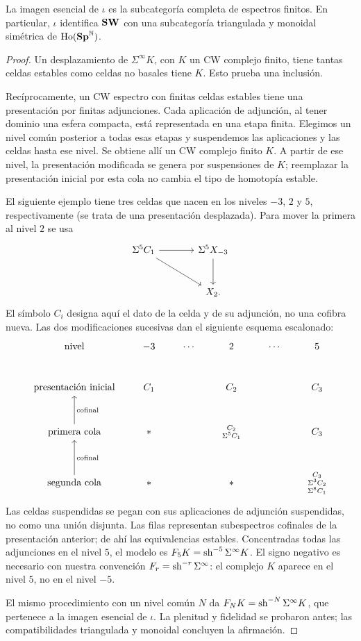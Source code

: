 \begin{prop}\label{prop:c18-imagen-finita}
La imagen esencial de $\iota$ es la subcategoría completa de espectros finitos. En particular, $\iota$ identifica $\mathbf{SW}$ con una subcategoría triangulada y monoidal simétrica de $\operatorname{Ho}(\mathbf{Sp}^{\mathbb N})$.
\end{prop}
\begin{proof}
Un desplazamiento de $\Sigma^\infty K$, con $K$ un CW complejo finito, tiene tantas celdas estables como celdas no basales tiene $K$. Esto prueba una inclusión.

Recíprocamente, un CW espectro con finitas celdas estables tiene una presentación por finitas adjunciones. Cada aplicación de adjunción, al tener dominio una esfera compacta, está representada en una etapa finita. Elegimos un nivel común posterior a todas esas etapas y suspendemos las aplicaciones y las celdas hasta ese nivel. Se obtiene allí un CW complejo finito $K$. A partir de ese nivel, la presentación modificada se genera por suspensiones de $K$; reemplazar la presentación inicial por esta cola no cambia el tipo de homotopía estable.

El siguiente ejemplo tiene tres celdas que nacen en los niveles $-3$, $2$ y $5$, respectivamente (se trata de una presentación desplazada). Para mover la primera al nivel $2$ se usa
\[
\begin{tikzcd}[column sep=large,row sep=large]
\Sigma^5C_1\arrow[r]\arrow[dr]&\Sigma^5X_{-3}\arrow[d]\\
&X_2.
\end{tikzcd}
\]
El símbolo $C_i$ designa aquí el dato de la celda y de su adjunción, no una cofibra nueva. Las dos modificaciones sucesivas dan el siguiente esquema escalonado:
\[
\begin{tikzcd}[column sep=2em,row sep=large]
\text{nivel}&-3&\cdots&2&\cdots&5\\
\text{presentación inicial}&C_1&&C_2&&C_3\\
\text{primera cola}\arrow[u,"\text{cofinal}"']&*&&\substack{C_2\\\Sigma^5C_1}&&C_3\\
\text{segunda cola}\arrow[u,"\text{cofinal}"']&*&&*&&\substack{C_3\\\Sigma^3C_2\\\Sigma^8C_1}
\end{tikzcd}
\]
Las celdas suspendidas se pegan con sus aplicaciones de adjunción suspendidas, no como una unión disjunta. Las filas representan subespectros cofinales de la presentación anterior; de ahí las equivalencias estables. Concentradas todas las adjunciones en el nivel $5$, el modelo es $F_5K=\operatorname{sh}^{-5}\Sigma^\infty K$. El signo negativo es necesario con nuestra convención $F_r=\operatorname{sh}^{-r}\Sigma^\infty$: el complejo $K$ aparece en el nivel $5$, no en el nivel $-5$.

El mismo procedimiento con un nivel común $N$ da $F_NK=\operatorname{sh}^{-N}\Sigma^\infty K$, que pertenece a la imagen esencial de $\iota$. La plenitud y fidelidad se probaron antes; las compatibilidades triangulada y monoidal concluyen la afirmación.
\end{proof}

